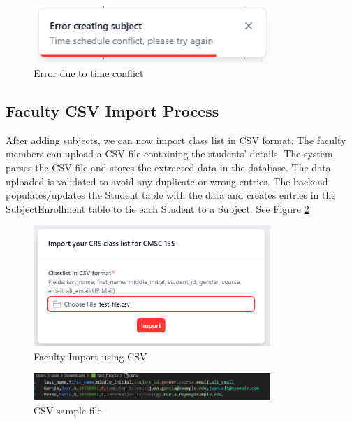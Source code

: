 \begin{figure}[h] %
	\centering
	\includegraphics[width=0.8\textwidth]{figures/chapter4/subject_add_error.png} %
	\caption{Error due to time conflict}
	\label{fig:subject_add_error}
\end{figure}
\subsection{Faculty CSV Import Process}
After adding subjects, we can now import class list in CSV format. The faculty members can upload a CSV file containing the students' details. The system parses the CSV file and stores the extracted data in the database. The data uploaded is validated to avoid any duplicate or wrong entries. The backend populates/updates the Student table with the data and creates entries in the SubjectEnrollment table to tie each Student to a Subject. See Figure \ref{fig:faculty_import}
\begin{figure}[h] %
	\centering
	\includegraphics[width=0.8\textwidth]{figures/chapter4/faculty_import.png} %
	\caption{Faculty Import using CSV}
	\label{fig:faculty_import}
\end{figure}
\begin{figure}[h] %
	\centering
	\includegraphics[width=0.8\textwidth]{figures/chapter4/faculty_import_csv.png} %
	\caption{CSV sample file}
	\label{fig:faculty_import_csv}
\end{figure}
